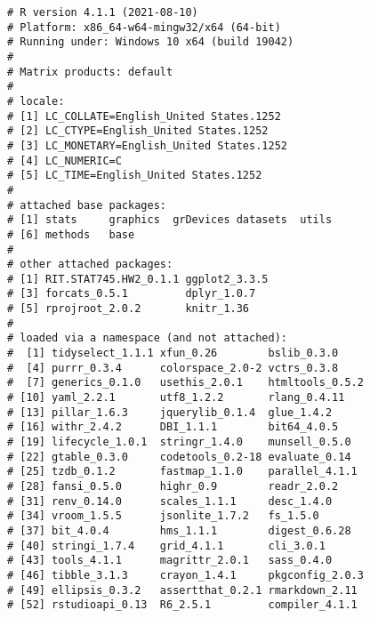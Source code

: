 \documentclass[
  11pt,
  a4paper,
]{scrartcl}
\begin{document}
\begin{verbatim}
# R version 4.1.1 (2021-08-10)
# Platform: x86_64-w64-mingw32/x64 (64-bit)
# Running under: Windows 10 x64 (build 19042)
# 
# Matrix products: default
# 
# locale:
# [1] LC_COLLATE=English_United States.1252 
# [2] LC_CTYPE=English_United States.1252   
# [3] LC_MONETARY=English_United States.1252
# [4] LC_NUMERIC=C                          
# [5] LC_TIME=English_United States.1252    
# 
# attached base packages:
# [1] stats     graphics  grDevices datasets  utils    
# [6] methods   base     
# 
# other attached packages:
# [1] RIT.STAT745.HW2_0.1.1 ggplot2_3.3.5        
# [3] forcats_0.5.1         dplyr_1.0.7          
# [5] rprojroot_2.0.2       knitr_1.36           
# 
# loaded via a namespace (and not attached):
#  [1] tidyselect_1.1.1 xfun_0.26        bslib_0.3.0     
#  [4] purrr_0.3.4      colorspace_2.0-2 vctrs_0.3.8     
#  [7] generics_0.1.0   usethis_2.0.1    htmltools_0.5.2 
# [10] yaml_2.2.1       utf8_1.2.2       rlang_0.4.11    
# [13] pillar_1.6.3     jquerylib_0.1.4  glue_1.4.2      
# [16] withr_2.4.2      DBI_1.1.1        bit64_4.0.5     
# [19] lifecycle_1.0.1  stringr_1.4.0    munsell_0.5.0   
# [22] gtable_0.3.0     codetools_0.2-18 evaluate_0.14   
# [25] tzdb_0.1.2       fastmap_1.1.0    parallel_4.1.1  
# [28] fansi_0.5.0      highr_0.9        readr_2.0.2     
# [31] renv_0.14.0      scales_1.1.1     desc_1.4.0      
# [34] vroom_1.5.5      jsonlite_1.7.2   fs_1.5.0        
# [37] bit_4.0.4        hms_1.1.1        digest_0.6.28   
# [40] stringi_1.7.4    grid_4.1.1       cli_3.0.1       
# [43] tools_4.1.1      magrittr_2.0.1   sass_0.4.0      
# [46] tibble_3.1.3     crayon_1.4.1     pkgconfig_2.0.3 
# [49] ellipsis_0.3.2   assertthat_0.2.1 rmarkdown_2.11  
# [52] rstudioapi_0.13  R6_2.5.1         compiler_4.1.1
\end{verbatim}
\end{document}
